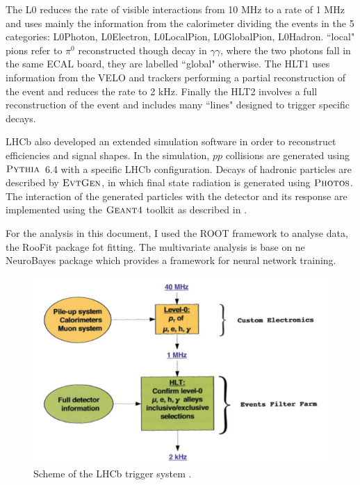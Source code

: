 The L0 reduces the rate of visible interactions from 10 MHz to a rate of 1 MHz and uses mainly the information from the 
calorimeter dividing the events in the 5 categories: L0Photon, L0Electron, L0LocalPion, L0GlobalPion, L0Hadron. ``local" pions
refer to $\pi^0$ reconstructed though decay in $\gamma\gamma$, where the two photons fall in the same ECAL board, they are
labelled ``global" otherwise. The HLT1 uses information from the VELO and trackers performing a partial reconstruction
of the event and reduces the rate to 2 kHz. Finally the HLT2 involves a full reconstruction of the event and includes many
``lines" designed to trigger specific decays.

LHCb also developed an extended simulation software in order to reconstruct efficiencies and signal shapes.
In the simulation, $pp$ collisions are generated using $\textsc{Pythia}$~6.4\cite{Sjostrand:2006za} with a specific
LHCb configuration\cite{LHCb-PROC-2010-056}. Decays of hadronic particles are described by $\textsc{EvtGen}$\cite{Lange:2001uf},
in which final state radiation is generated using $\textsc{Photos}$\cite{Golonka:2005pn}. The interaction of the generated
particles with the detector and its response are implemented using the $\textsc{Geant4}$ toolkit\cite{Allison:2006ve, *Agostinelli:2002hh}
as described in \cite{LHCb-PROC-2011-006}.

For the analysis in this document, I used the ROOT framework\cite{Brun:2000es} to analyse data, the RooFit package
fot fitting. The multivariate analysis is base on ne NeuroBayes package \cite{} which provides a framework
for neural network training.

\begin{figure}[t!]
\label{triggerscheme}
\centering \includegraphics[width=0.8\linewidth]{Detector/figs/triggerscheme.png}
\caption{Scheme of the LHCb trigger system \cite{Alves:2008zz}.}
\end{figure}





